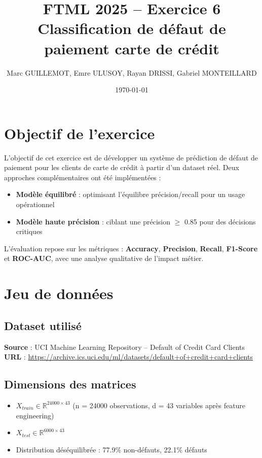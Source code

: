 \documentclass[11pt,a4paper]{article}
\title{\textbf{FTML 2025 -- Exercice 6} \\ 
Classification de défaut de paiement carte de crédit}
\author{Marc GUILLEMOT, Emre ULUSOY, Rayan DRISSI, Gabriel MONTEILLARD}
\date{\today}
\begin{document}
\maketitle

\section{Objectif de l'exercice}

L'objectif de cet exercice est de développer un système de prédiction de défaut de paiement pour les clients de carte de crédit à partir d'un dataset réel. Deux approches complémentaires ont été implémentées :
\begin{itemize}
    \item \textbf{Modèle équilibré} : optimisant l'équilibre précision/recall pour un usage opérationnel
    \item \textbf{Modèle haute précision} : ciblant une précision $\geq$ 0.85 pour des décisions critiques
\end{itemize}

L'évaluation repose sur les métriques : \textbf{Accuracy}, \textbf{Precision}, \textbf{Recall}, \textbf{F1-Score} et \textbf{ROC-AUC}, avec une analyse qualitative de l'impact métier.

\section{Jeu de données}

\subsection{Dataset utilisé}
\textbf{Source} : UCI Machine Learning Repository -- Default of Credit Card Clients \\
\textbf{URL} : \url{https://archive.ics.uci.edu/ml/datasets/default+of+credit+card+clients}

\subsection{Dimensions des matrices}
\begin{itemize}
    \item $X_{train} \in \mathbb{R}^{24000 \times 43}$ (n = 24000 observations, d = 43 variables après feature engineering)
    \item $X_{test} \in \mathbb{R}^{6000 \times 43}$
    \item Distribution déséquilibrée : 77.9\% non-défauts, 22.1\% défauts
\end{itemize}
\end{document}
